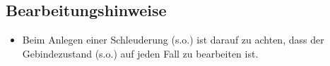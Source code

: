 \subsection{Bearbeitungshinweise}
\begin{itemize}
\item Beim Anlegen einer Schleuderung (s.o.) ist darauf zu achten, dass der Gebindezustand (s.o.) auf jeden Fall zu bearbeiten ist.
\end{itemize}
